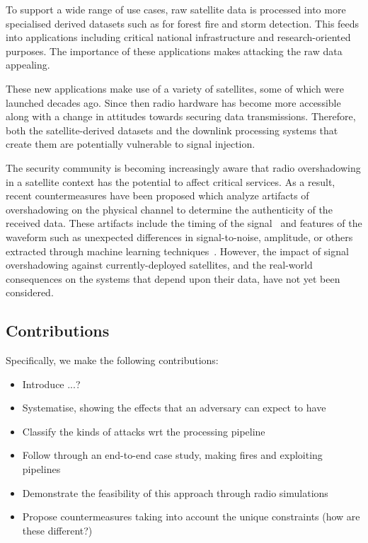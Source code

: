 To support a wide range of use cases, raw satellite data is processed into more specialised derived datasets such as for forest fire and storm detection.
This feeds into applications including critical national infrastructure and research-oriented purposes.
The importance of these applications makes attacking the raw data appealing.

These new applications make use of a variety of satellites, some of which were launched decades ago.
Since then radio hardware has become more accessible along with a change in attitudes towards securing data transmissions.
Therefore, both the satellite-derived datasets and the downlink processing systems that create them are potentially vulnerable to signal injection.

The security community is becoming increasingly aware that radio overshadowing in a satellite context has the potential to affect critical services.
As a result, recent countermeasures have been proposed which analyze artifacts of overshadowing on the physical channel to determine the authenticity of the received data.
These artifacts include the timing of the signal~\cite{jedermann2021orbit} and features of the waveform such as unexpected differences in signal-to-noise, amplitude, or others extracted through machine learning techniques~\cite{oligeri2020past}.
However, the impact of signal overshadowing against currently-deployed satellites, and the real-world consequences on the systems that depend upon their data, have not yet been considered.

\subsection{Contributions}

Specifically, we make the following contributions:

\begin{itemize}
    \item Introduce ...?
    \item Systematise, showing the effects that an adversary can expect to have
    \item Classify the kinds of attacks wrt the processing pipeline
    \item Follow through an end-to-end case study, making fires and exploiting pipelines
    \item Demonstrate the feasibility of this approach through radio simulations
    \item Propose countermeasures taking into account the unique constraints (how are these different?)
\end{itemize}

